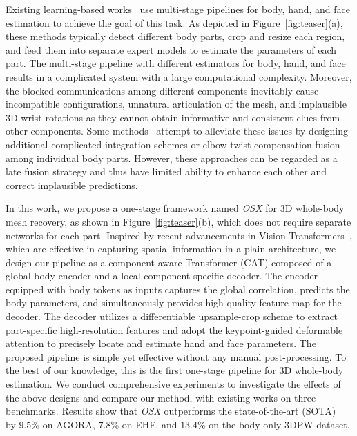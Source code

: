 \documentclass[10pt,twocolumn,letterpaper]{article}
\newcommand{\modelname}{\emph{OSX}\xspace}
\begin{document}
Existing learning-based works~\cite{PavlakosGeorgios2020expose,Feng_2021_pixie,Rong_2021frank,GyeongsikMoon2020hand4whole,HongwenZhang2022PyMAFXTW} use multi-stage pipelines for body, hand, and face estimation to achieve the goal of this task. 
As depicted in Figure~\ref{fig:teaser}(a), these methods typically detect different body parts, crop and resize each region, and feed them into separate expert models to estimate the parameters of each part. 
The multi-stage pipeline with different estimators for body, hand, and face results in a complicated system with a large computational complexity. Moreover, the blocked communications among different components inevitably cause incompatible configurations, unnatural articulation of the mesh, and implausible 3D wrist rotations as they cannot obtain informative and consistent clues from other components. 
Some methods~\cite{Feng_2021_pixie,GyeongsikMoon2020hand4whole,HongwenZhang2022PyMAFXTW} attempt to alleviate these issues by designing additional complicated integration schemes or elbow-twist compensation fusion among individual body parts. However, these approaches can be regarded as a late fusion strategy and thus have limited ability to enhance each other and correct implausible predictions. 

In this work, we propose a one-stage framework named \modelname for 3D whole-body mesh recovery, as shown in Figure~\ref{fig:teaser}(b), which does not require separate networks for each part.
Inspired by recent advancements in Vision Transformers~\cite{dosovitskiy2020vit,YufeiXu2022ViTPoseSV}, which are effective in capturing spatial information in a plain architecture, we design our pipeline as a component-aware Transformer (CAT) composed of a global body encoder and a local component-specific decoder. The encoder equipped with body tokens as inputs captures the global correlation, predicts the body parameters, and simultaneously provides high-quality feature map for the decoder.
The decoder utilizes a differentiable upsample-crop scheme to extract part-specific high-resolution features and adopt the keypoint-guided deformable attention to precisely locate and estimate hand and face parameters. 
 The proposed pipeline is simple yet effective without any manual post-processing. To the best of our knowledge, this is the first one-stage pipeline for 3D whole-body estimation. 
We conduct comprehensive experiments to investigate the effects of the above designs and compare our method, with existing works on three benchmarks. Results show that \modelname outperforms the state-of-the-art (SOTA)~\cite{GyeongsikMoon2020hand4whole} by $9.5$\% on AGORA, $7.8$\% on EHF, and $13.4$\% on the body-only 3DPW dataset.
\end{document}

